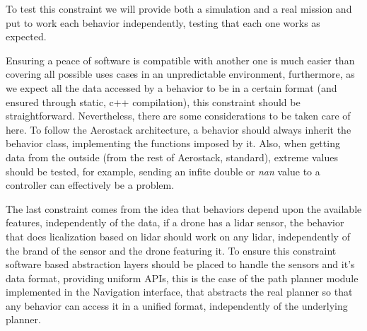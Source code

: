   To test this constraint we will provide both a simulation and a real mission and put to work each behavior independently, testing that each one works as expected.


  Ensuring a peace of software is compatible with another one is much easier than covering all possible uses cases in an unpredictable environment, furthermore, as we expect all the data accessed by a behavior to be in a certain format (and ensured through static, c++ compilation), this constraint should be straightforward. Nevertheless, there are some considerations to be taken care of here. To follow the Aerostack architecture, a behavior should always inherit the behavior class, implementing the functions imposed by it. Also, when getting data from the outside (from the rest of Aerostack, standard), extreme values should be tested, for example, sending an infite double or \textit{nan} value to a controller can effectively be a problem.

  The last constraint comes from the idea that behaviors depend upon the available features, independently of the data, if a drone has a lidar sensor, the behavior that does licalization based on lidar should work on any lidar, independently of the brand of the sensor and the drone featuring it. To ensure this constraint software based abstraction layers should be placed to handle the sensors and it's data format, providing uniform APIs, this is the case of the path planner module implemented in the Navigation interface, that abstracts the real planner so that any behavior can access it in a unified format, independently of the underlying planner.

\pagebreak

